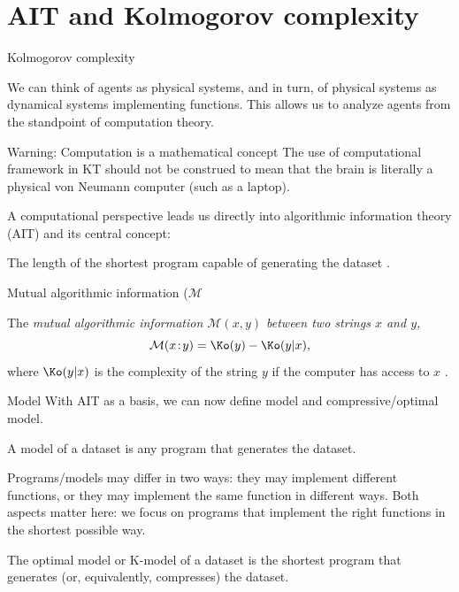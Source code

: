 \section{AIT and Kolmogorov complexity}
\begin{frame}[label=intro3]{Kolmogorov complexity}

 We can think of agents as physical systems, and in turn,  of physical systems as dynamical systems implementing functions.   This allows us to analyze agents from the standpoint of computation theory.
 \begin{alertblock}{Warning: Computation is a mathematical concept}
The use of computational framework  in KT should not be construed to mean that the brain is literally a physical von Neumann computer (such as a laptop).
\end{alertblock}\vfill 
 
A computational perspective  leads us directly into algorithmic information theory (AIT) and its central concept: 


\begin{definition}
The length of the shortest program capable of generating  the dataset \citep{Kolomgorov1965,Cover:2006aa}.  
\end{definition} \vfill


\end{frame}

\begin{frame}[label=intro3]{Mutual algorithmic information ($\mathcal M$}

The {\em mutual algorithmic information  $\mathcal M(x,y)$ between two strings $x$ and $y$,   }
$$
\mathcal M(x \!:\!y) = \Ko(y)- \Ko(y|x),
$$
where $\Ko(y|x)$ is the complexity of the string $y$ if the computer has access to $x$ \citep{Li:1997aa, Grunwald:2004aa}.  
\end{frame}


\begin{frame}[label=ladila]{Model}
 With AIT as a basis, we can now define model and compressive/optimal model. \vfill 
 
 \begin{definition}[Model I]
 A  model  of a dataset is any program that generates the dataset. 
 \end{definition}
 Programs/models may differ in two ways: they may implement different functions, or they may implement the same function in different ways. Both aspects matter here:  we focus on programs that implement the right functions in the shortest possible way. \vfill 
 
\begin{definition}[K-model]
The optimal model or K-model of a dataset is the shortest program that generates (or, equivalently, compresses) the dataset.
\end{definition}
\end{frame}



